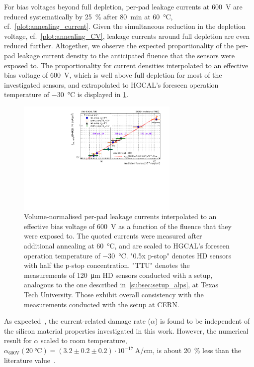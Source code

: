 For bias voltages beyond full depletion, per-pad leakage currents at \SI{600}{\volt} are reduced systematically by \SI{25}{\percent} after \SI{80}{\minute} at \SI{60}{\celsius}, cf.~\ref{plot:annealing_current}.
Given the simultaneous reduction in the depletion voltage, cf.~\ref{plot:annealing_CV}, leakage currents around full depletion are even reduced further.
Altogether, we observe the expected proportionality of the per-pad leakage current density to the anticipated fluence that the sensors were exposed to.
The proportionality for current densities interpolated to an effective bias voltage of \SI{600}{\volt}, which is well above full depletion for most of the investigated sensors, and extrapolated to HGCAL's foreseen operation temperature of \SI{-30}{\celsius} is displayed in \ref{plot:alpha_600}.
\begin{figure}
	\captionsetup[subfigure]{aboveskip=-1pt,belowskip=-1pt}
	\centering
    \includegraphics[width=0.69\textwidth]{plots/alpha/alpha_600V.pdf}
	\caption{
		Volume-normalised per-pad leakage currents interpolated to an effective bias voltage of \SI{600}{\volt} as a function of the fluence that they were exposed to.
        The quoted currents were measured after additional annealing at \SI{60}{\celsius}, and are scaled to HGCAL's foreseen operation temperature of \SI{-30}{\celsius}.
		"0.5x p-stop" denotes HD sensors with half the p-stop concentration.
		"TTU" denotes the measurements of \SI{120}{\micro\meter} HD sensors conducted with a setup, analogous to the one described in~\ref{subsec:setup_alps}, at Texas Tech University. 
		Those exhibit overall consistency with the measurements conducted with the setup at CERN.
		}
	\label{plot:alpha_600}
\end{figure}
As expected~\cite{MOLL199987}, the current-related damage rate ($\alpha$) is found to be independent of the silicon material properties investigated in this work.
However, the numerical result for $\alpha$ scaled to room temperature, $\alpha_\text{600V}(\SI{+20}{\celsius})=\left(3.2\pm 0.2\pm 0.2\right)\cdot 10^{-17}~$A/cm, is about \SI{20}{\percent} less than the literature value~\cite{moll:SiDamages}.
